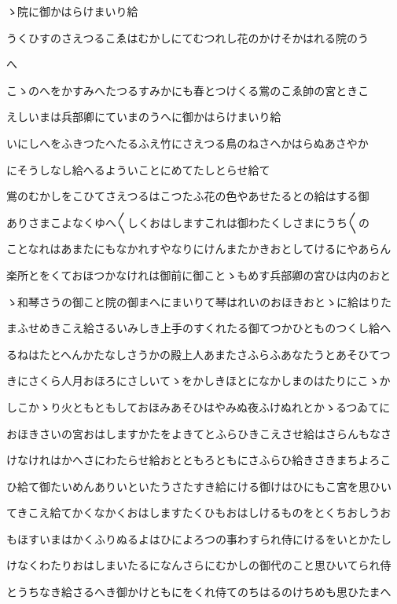 \documentclass[a4paper,11pt,landscape]{ltjtarticle}
\begin{document}
ゝ院に御かはらけまいり給
\par\medskip
うくひすのさえつるこゑはむかしにてむつれし花のかけそかはれる院のう
\par\medskip
へ
\par\medskip
こゝのへをかすみへたつるすみかにも春とつけくる鴬のこゑ帥の宮ときこ
\par\medskip
えしいまは兵部卿にていまのうへに御かはらけまいり給
\par\medskip
いにしへをふきつたへたるふえ竹にさえつる鳥のねさへかはらぬあさやか
\par\medskip
にそうしなし給へるよういことにめてたしとらせ給て
\par\medskip
鴬のむかしをこひてさえつるはこつたふ花の色やあせたるとの給はする御
\par\medskip
ありさまこよなくゆへ〱しくおはしますこれは御わたくしさまにうち〱の
\par\medskip
ことなれはあまたにもなかれすやなりにけんまたかきおとしてけるにやあらん
\par\medskip
楽所とをくておほつかなけれは御前に御ことゝもめす兵部卿の宮ひは内のおと
\par\medskip
ゝ和琴さうの御こと院の御まへにまいりて琴はれいのおほきおとゝに給はりた
\par\medskip
まふせめきこえ給さるいみしき上手のすくれたる御てつかひとものつくし給へ
\par\medskip
るねはたとへんかたなしさうかの殿上人あまたさふらふあなたうとあそひてつ
\par\medskip
きにさくら人月おほろにさしいてゝをかしきほとになかしまのはたりにこゝか
\par\medskip
しこかゝり火ともともしておほみあそひはやみぬ夜ふけぬれとかゝるつゐてに
\par\medskip
おほきさいの宮おはしますかたをよきてとふらひきこえさせ給はさらんもなさ
\par\medskip
けなけれはかへさにわたらせ給おとともろともにさふらひ給きさきまちよろこ
\par\medskip
ひ給て御たいめんありいといたうさたすき給にける御けはひにもこ宮を思ひい
\par\medskip
てきこえ給てかくなかくおはしますたくひもおはしけるものをとくちおしうお
\par\medskip
もほすいまはかくふりぬるよはひによろつの事わすられ侍にけるをいとかたし
\par\medskip
けなくわたりおはしまいたるになんさらにむかしの御代のこと思ひいてられ侍
\par\medskip
とうちなき給さるへき御かけともにをくれ侍てのちはるのけちめも思ひたまへ
\end{document}
